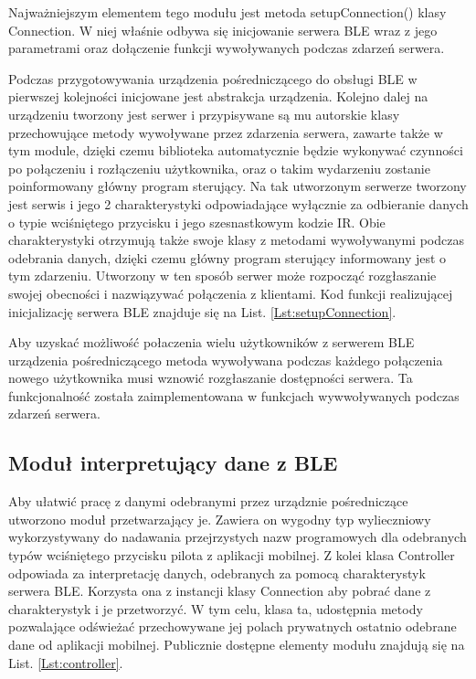 \documentclass[12pt,twoside]{article}
\begin{document}


Najważniejszym elementem tego modułu jest metoda setupConnection() klasy Connection. W niej właśnie odbywa się inicjowanie serwera BLE wraz z jego parametrami oraz dołączenie funkcji wywoływanych podczas zdarzeń serwera.

Podczas przygotowywania urządzenia pośredniczącego do obsługi BLE w pierwszej kolejności inicjowane jest abstrakcja urządzenia. Kolejno dalej na urządzeniu tworzony jest serwer i przypisywane są mu autorskie klasy przechowujące metody wywoływane przez zdarzenia serwera, zawarte także w tym module, dzięki czemu biblioteka automatycznie będzie wykonywać czynności po połączeniu i rozłączeniu użytkownika, oraz o takim wydarzeniu zostanie poinformowany główny program sterujący.
Na tak utworzonym serwerze tworzony jest serwis i jego 2 charakterystyki odpowiadające wyłącznie za odbieranie danych o typie wciśniętego przycisku i jego szesnastkowym kodzie IR. Obie charakterystyki otrzymują także swoje klasy z metodami wywoływanymi podczas odebrania danych, dzięki czemu główny program sterujący informowany jest o tym zdarzeniu. Utworzony w ten sposób serwer może rozpocząć rozgłaszanie swojej obecności i nazwiązywać połączenia z klientami. Kod funkcji realizującej inicjalizację serwera BLE znajduje się na List. \ref*{Lst:setupConnection}.



Aby uzyskać możliwość połaczenia wielu użytkowników z serwerem BLE urządzenia pośredniczącego metoda wywoływana podczas każdego połączenia nowego użytkownika musi wznowić rozgłaszanie dostępności serwera. Ta funkcjonalność została zaimplementowana w funkcjach wywwoływanych podczas zdarzeń serwera.
\subsection{Moduł interpretujący dane z BLE}
Aby ułatwić pracę z danymi odebranymi przez urządznie pośredniczące utworzono moduł przetwarzający je. Zawiera on wygodny typ wylieczniowy wykorzystywany do nadawania przejrzystych nazw programowych dla odebranych typów wciśniętego przycisku pilota z aplikacji mobilnej.
Z kolei klasa Controller odpowiada za interpretację danych, odebranych za pomocą charakterystyk serwera BLE. Korzysta ona z instancji klasy Connection aby pobrać dane z charakterystyk i je przetworzyć. W tym celu, klasa ta, udostępnia metody pozwalające odświeżać przechowywane jej polach prywatnych ostatnio odebrane dane od aplikacji mobilnej. Publicznie dostępne elementy modułu znajdują się na List. \ref*{Lst:controller}.
\end{document}
